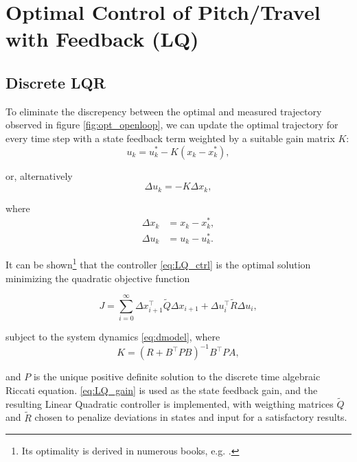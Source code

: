 \section{Optimal Control of Pitch/Travel with Feedback (LQ)}\label{sec:prob3}
\label{text:problem3}

\subsection{Discrete LQR}
\label{text:LQR}

To eliminate the discrepency between the optimal and measured trajectory observed in figure \ref{fig:opt_openloop}, we can update the optimal trajectory for every time step with a state feedback term weighted by a suitable gain matrix $K$:
\begin{equation*}
u_k = u_k^* - K (x_k - x_k^*),
\end{equation*}

or, alternatively
\begin{equation}
\label{eq:LQ_ctrl}
\Delta u_k = - K \Delta x_k,
\end{equation}

where 
\begin{align*}
\Delta x_k &= x_k - x_k^*,\\
\Delta u_k &= u_k - u_k^*.
\end{align*}

It can be shown\footnote{Its optimality is derived in numerous books, e.g. \cite{Kwakernaak1972}.} that the controller \eqref{eq:LQ_ctrl} is the optimal solution minimizing the quadratic objective function

\begin{equation*}
	J = \sum_{i=0}^{\infty} \Delta x_{i+1}^\top \tilde{Q} \Delta x_{i+1} + \Delta u_i^\top \tilde{R} \Delta u_i,
\end{equation*}

subject to the system dynamics \eqref{eq:dmodel}, where
\begin{equation}
\label{eq:LQ_gain}
	K = (R + B^\top P B)^{-1} B^\top P A,
\end{equation}

and $P$ is the unique positive definite solution to the discrete time algebraic Riccati equation. \eqref{eq:LQ_gain} is used as the state feedback gain, and the resulting Linear Quadratic controller is implemented, with weigthing matrices $\tilde{Q}$ and $\tilde{R}$ chosen to penalize deviations in states and input for a satisfactory results.

